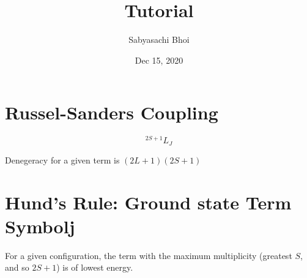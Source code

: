\documentclass[12pt]{article}
\theoremstyle{definition}
\begin{document}
\title{Tutorial}
\author{Sabyasachi Bhoi}
\date{ Dec 15, 2020 }
\maketitle

\section{Russel-Sanders Coupling}

\large { 
	\begin{equation*}
		^{2S + 1}L_{J}
	\end{equation*}
}

Denegeracy for a given term is $(2L+1)(2S+1)$

\section{Hund's Rule: Ground state Term Symbolj}
For a given configuration, the term with the maximum multiplicity (greatest $S$, and so $2S+1$) is of lowest energy.
\end{document}
